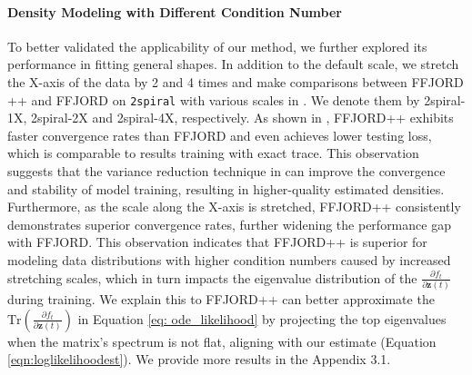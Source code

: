 \paragraph{Density Modeling with Different Condition Number}
To better validated the applicability of our method, we further explored its performance in fitting general shapes.
In addition to the default scale, we stretch the X-axis of the data by 2 and 4 times and make comparisons between FFJORD ++ and FFJORD on \texttt{2spiral}
with various scales in .
We denote them by 2spiral-1X, 2spiral-2X and 2spiral-4X, respectively.
As shown in , FFJORD++ exhibits faster convergence rates than FFJORD and even achieves lower testing loss, which is comparable to results training with exact trace. 
This observation suggests that the variance reduction technique in  can improve the convergence and stability of model training, resulting in higher-quality estimated densities.
Furthermore, 
as the scale along the X-axis is stretched, FFJORD++ consistently demonstrates superior convergence rates, further widening the performance gap with FFJORD.
This observation indicates that FFJORD++ is superior for modeling data distributions with higher condition numbers caused by increased stretching scales, which in turn impacts the eigenvalue distribution of the $\frac{\partial f_t}{\partial \mathbf{z}(t)}$ during training. 
We explain this to FFJORD++ can better approximate the $ \mathrm{Tr} \left( \frac{\partial f_t}{\partial \mathbf{z}(t)} \right)$ in Equation \ref{eq: ode_likelihood} by projecting the top eigenvalues when the matrix's spectrum is not flat, aligning with our estimate (Equation \ref{eqn:loglikelihoodest}). We provide more results in the Appendix 3.1.


